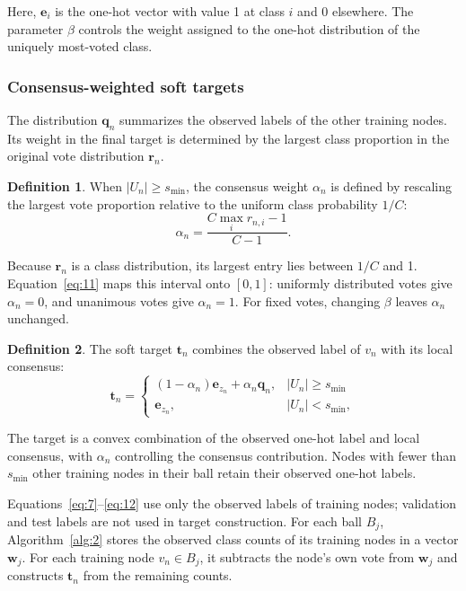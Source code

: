 \documentclass[10pt,letterpaper,nopreprintline]{elsarticle}
\theoremstyle{definition}
\newtheorem{definition}{Definition}
\theoremstyle{plain}
\begin{document}
Here, \(\mathbf e_i\) is the one-hot vector with value 1 at class \(i\) and 0 elsewhere. The parameter \(\beta\) controls the weight assigned to the one-hot distribution of the uniquely most-voted class.

\subsubsection{Consensus-weighted soft targets}\label{sec:3.3.2}

The distribution \(\mathbf q_n\) summarizes the observed labels of the other training nodes. Its weight in the final target is determined by the largest class proportion in the original vote distribution \(\mathbf r_n\).

\begin{definition}
When \(|U_n|\geq s_{\min}\), the consensus weight \(\alpha_n\) is defined by rescaling the largest vote proportion relative to the uniform class probability \(1/C\):
\begin{equation}\label{eq:11}
\alpha_n=\frac{C\max_i r_{n,i}-1}{C-1}.
\end{equation}
\end{definition}

Because \(\mathbf r_n\) is a class distribution, its largest entry lies between \(1/C\) and 1. Equation~\eqref{eq:11} maps this interval onto \([0,1]\): uniformly distributed votes give \(\alpha_n=0\), and unanimous votes give \(\alpha_n=1\). For fixed votes, changing \(\beta\) leaves \(\alpha_n\) unchanged.

\Needspace{64pt}
\begin{definition}
The soft target \(\mathbf t_n\) combines the observed label of \(v_n\) with its local consensus:
\begin{equation}\label{eq:12}
\mathbf t_n=
\begin{cases}
(1-\alpha_n)\mathbf e_{z_n}+\alpha_n\mathbf q_n,&|U_n|\geq s_{\min}\\
\mathbf e_{z_n},&|U_n|<s_{\min},
\end{cases}
\end{equation}
\end{definition}

The target is a convex combination of the observed one-hot label and local consensus, with \(\alpha_n\) controlling the consensus contribution. Nodes with fewer than \(s_{\min}\) other training nodes in their ball retain their observed one-hot labels.

Equations~\eqref{eq:7}--\eqref{eq:12} use only the observed labels of training nodes; validation and test labels are not used in target construction. For each ball \(B_j\), Algorithm~\ref{alg:2} stores the observed class counts of its training nodes in a vector \(\mathbf w_j\). For each training node \(v_n\in B_j\), it subtracts the node's own vote from \(\mathbf w_j\) and constructs \(\mathbf t_n\) from the remaining counts.
\end{document}
